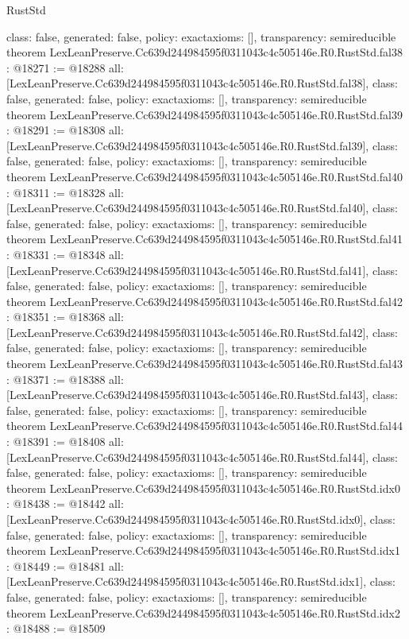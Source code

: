 \begin{lexlean}{RustStd}
\begin{coremodule}
{  class: false,
  generated: false,
  policy: exact{axioms: []},
  transparency: semireducible
}
theorem LexLeanPreserve.Cc639d244984595f0311043c4c505146e.R0.RustStd.fal38 : @18271 := @18288 {
  all: [LexLeanPreserve.Cc639d244984595f0311043c4c505146e.R0.RustStd.fal38],
  class: false,
  generated: false,
  policy: exact{axioms: []},
  transparency: semireducible
}
theorem LexLeanPreserve.Cc639d244984595f0311043c4c505146e.R0.RustStd.fal39 : @18291 := @18308 {
  all: [LexLeanPreserve.Cc639d244984595f0311043c4c505146e.R0.RustStd.fal39],
  class: false,
  generated: false,
  policy: exact{axioms: []},
  transparency: semireducible
}
theorem LexLeanPreserve.Cc639d244984595f0311043c4c505146e.R0.RustStd.fal40 : @18311 := @18328 {
  all: [LexLeanPreserve.Cc639d244984595f0311043c4c505146e.R0.RustStd.fal40],
  class: false,
  generated: false,
  policy: exact{axioms: []},
  transparency: semireducible
}
theorem LexLeanPreserve.Cc639d244984595f0311043c4c505146e.R0.RustStd.fal41 : @18331 := @18348 {
  all: [LexLeanPreserve.Cc639d244984595f0311043c4c505146e.R0.RustStd.fal41],
  class: false,
  generated: false,
  policy: exact{axioms: []},
  transparency: semireducible
}
theorem LexLeanPreserve.Cc639d244984595f0311043c4c505146e.R0.RustStd.fal42 : @18351 := @18368 {
  all: [LexLeanPreserve.Cc639d244984595f0311043c4c505146e.R0.RustStd.fal42],
  class: false,
  generated: false,
  policy: exact{axioms: []},
  transparency: semireducible
}
theorem LexLeanPreserve.Cc639d244984595f0311043c4c505146e.R0.RustStd.fal43 : @18371 := @18388 {
  all: [LexLeanPreserve.Cc639d244984595f0311043c4c505146e.R0.RustStd.fal43],
  class: false,
  generated: false,
  policy: exact{axioms: []},
  transparency: semireducible
}
theorem LexLeanPreserve.Cc639d244984595f0311043c4c505146e.R0.RustStd.fal44 : @18391 := @18408 {
  all: [LexLeanPreserve.Cc639d244984595f0311043c4c505146e.R0.RustStd.fal44],
  class: false,
  generated: false,
  policy: exact{axioms: []},
  transparency: semireducible
}
theorem LexLeanPreserve.Cc639d244984595f0311043c4c505146e.R0.RustStd.idx0 : @18438 := @18442 {
  all: [LexLeanPreserve.Cc639d244984595f0311043c4c505146e.R0.RustStd.idx0],
  class: false,
  generated: false,
  policy: exact{axioms: []},
  transparency: semireducible
}
theorem LexLeanPreserve.Cc639d244984595f0311043c4c505146e.R0.RustStd.idx1 : @18449 := @18481 {
  all: [LexLeanPreserve.Cc639d244984595f0311043c4c505146e.R0.RustStd.idx1],
  class: false,
  generated: false,
  policy: exact{axioms: []},
  transparency: semireducible
}
theorem LexLeanPreserve.Cc639d244984595f0311043c4c505146e.R0.RustStd.idx2 : @18488 := @18509 {
}
\end{coremodule}
\end{lexlean}
